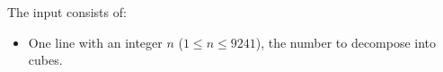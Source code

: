 
    The input consists of:
    \begin{itemize}
        \item One line with an integer $n$ ($1\leq n\leq 9241$), the number to decompose into cubes.
    \end{itemize}
